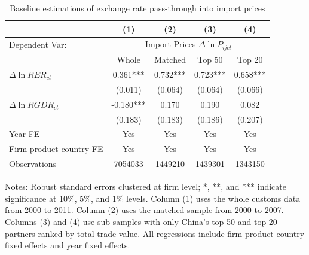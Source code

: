 \begin{table}[H]
	\centering
	\caption{Baseline estimations of exchange rate pass-through into import prices}
	\begin{threeparttable}
		\begin{tabular}{lcccc}
			\toprule
			& (1)   & (2)   & (3)   & (4) \\
			\midrule
			Dependent Var: & \multicolumn{4}{c}{ Import Prices $\Delta \ln P_{ijct}$} \\
			& Whole & Matched & Top 50 & Top 20 \\
			\midrule
			$\Delta \ln RER_{ct}$ & 0.361*** & 0.732*** & 0.723*** & 0.658*** \\
			& (0.011) & (0.064) & (0.064) & (0.066) \\
			$\Delta \ln RGDR_{ct}$ & -0.180*** & 0.170 & 0.190 & 0.082 \\
			& (0.183) & (0.183) & (0.186) & (0.207) \\
                \midrule
			Year FE  & Yes   & Yes   & Yes   & Yes \\
			Firm-product-country FE & Yes   & Yes   & Yes   & Yes \\
			Observations & 7054033 & 1449210 & 1439301 & 1343150 \\
			\bottomrule
		\end{tabular}
		\begin{tablenotes}
			\footnotesize
			\item Notes: Robust standard errors clustered at firm level;  *, **, and *** indicate significance at 10\%, 5\%, and 1\% levels. Column (1) uses the whole customs data from 2000 to 2011. Column (2) uses the matched sample from 2000 to 2007. Columns (3) and (4) use sub-samples with only China's top 50 and top 20 partners ranked by total trade value. All regressions include firm-product-country fixed effects and year fixed effects. 
		\end{tablenotes}
	\end{threeparttable}
	\label{tab.baseline}
\end{table}

